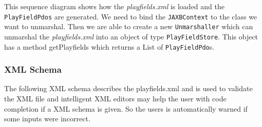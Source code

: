 \documentclass[fontsize=12pt,
               paper=a4,
               twoside=false,
               parskip=half,
               ]{scrartcl}
\begin{document}
This sequence diagram shows how the \emph{playfields.xml} is loaded and the \texttt{PlayFieldPdos} are generated.
We need to bind the \texttt{JAXBContext} to the class we want to unmarshal. Then we are able to create a new \texttt{Unmarshaller} which can unmarshal the \emph{playfields.xml} into an object of type \texttt{PlayFieldStore}. This object has a method getPlayfields which returns a List of \texttt{PlayFieldPdo}s.


\subsubsection{XML Schema}

The following XML schema describes the playfields.xml and is used to validate the XML file and intelligent XML editors may help the user with code completion if a XML schema is given. So the users is automatically warned if some inputs were incorrect.
\end{document}
